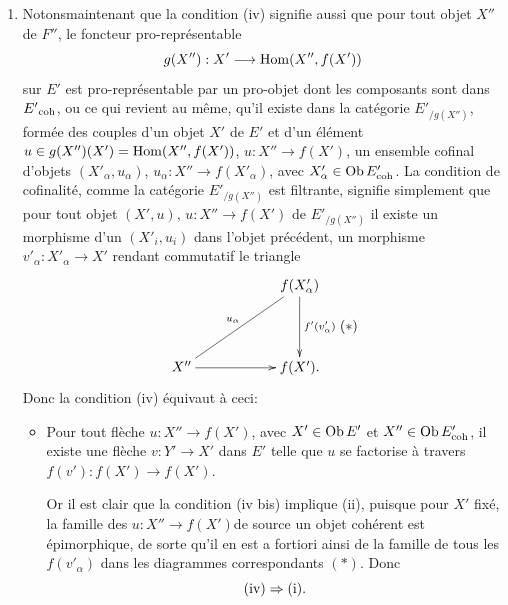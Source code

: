 \documentclass[10pt]{../fichiers-configuration-latex/smfart}
\begin{document}
\begin{enumerate}
\item Notons\pageoriginale maintenant que la condition (iv) signifie
  aussi que pour   tout objet $X''$ de $F''$, le foncteur pro-représentable
$$
g(X'') : X'\to \Hom (X'', f(X'))
$$
sur $E'$ est pro-représentable par un pro-objet dont les composants
sont dans ${E'}_{\mathrm{coh}}$, ou ce qui revient au même, qu'il existe
dans la catégorie $E'_{/g(X'')}$, formée des couples d'un objet $X'$
de $E'$ et d'un élément $u \in g(X'') (X') =\operatorname{Hom}(X'', f(X'))$, $u :
X''\to f(X')$, un ensemble cofinal d'objets $(X'_{\alpha},
u_{\alpha})$, $u_{\alpha} : X'' \to f(X'_{\alpha})$, avec
$X'_{\alpha} \in \operatorname{Ob} E'_{\mathrm{coh}}$. La condition de cofinalité, comme
la catégorie $E'_{/g(X'')}$ est filtrante, signifie simplement que
pour tout objet $(X', u)$, $u : X''\to f(X')$ de $E'_{/g(X'')}$ il
existe un morphisme d'un $({X'}_i, u_i)$ dans l'objet précédent, \ie
un morphisme $v'_{\alpha} : X'_{\alpha} \to X'$ rendant commutatif
le triangle
\[\vcenter{
\xymatrix@C=2cm@R=1.5cm{
                      &f(X'_{\alpha}) \ar[d]^{f'(v'_\alpha)}\\
X''\ar@{-}[ru]^{u_{\alpha}} \ar[r]& f(X').
}}\leqno{(*)}
\]
Donc la condition (iv) équivaut à ceci:

\begin{itemize}
\item[(iv bis)] Pour tout flèche $u : X''\to f(X')$, avec $X'\in \operatorname{Ob}
  E'$ et $X''\in \operatorname{Ob} E'_{\mathrm{coh}}$, il existe une flèche $v : Y'\to X'$
  dans $E'$ telle que $u$ se factorise à travers $f(v') : f(X') \to
  f(X')$.

Or il est clair que la condition (iv bis) implique (ii),
  puisque pour $X'$ fixé, la famille des $u : X''\to
  f(X')$\pageoriginale de source un objet cohérent est épimorphique, de sorte qu'il en est a fortiori
  ainsi de la famille de tous les $f(v'_{\alpha})$ dans les
  diagrammes correspondants $(\ast)$. Donc
$$
{\rm(iv)} \Rightarrow {\rm(i)}{}.
$$
\end{itemize}


\end{enumerate}
\end{document}
